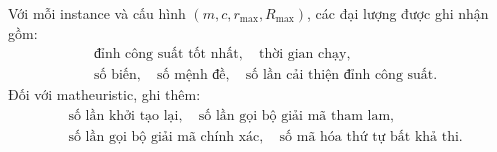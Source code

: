\documentclass[12pt]{article}
\begin{document}
Với mỗi instance và cấu hình $(m,c,r_{\max},R_{\max})$, các đại lượng được ghi nhận gồm:
\[
\begin{aligned}
&\text{đỉnh công suất tốt nhất},\quad
\text{thời gian chạy},\\
&\text{số biến},\quad
\text{số mệnh đề},\quad
\text{số lần cải thiện đỉnh công suất}.
\end{aligned}
\]
Đối với matheuristic, ghi thêm:
\[
\begin{aligned}
&\text{số lần khởi tạo lại},\quad
\text{số lần gọi bộ giải mã tham lam},\\
&\text{số lần gọi bộ giải mã chính xác},\quad
\text{số mã hóa thứ tự bất khả thi}.
\end{aligned}
\]
\end{document}
